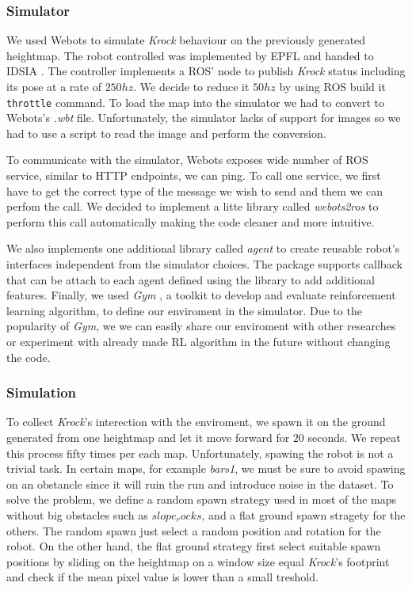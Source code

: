 \documentclass[../document.tex]{subfiles}
\begin{document}
\subsubsection{Simulator}
We used Webots to simulate \emph{Krock} behaviour on the previously generated heightmap. The robot controlled was implemented by EPFL  and handed to IDSIA . The controller implements a ROS' node to publish \emph{Krock} status including its pose at a rate of $250hz$. We decide to reduce it $50hz$ by using ROS build it \texttt{throttle} command. 
To load the map into the simulator we had to convert to Webots's \emph{.wbt} file. Unfortunately, the simulator lacks of support for images so we had to use a script to read the image and perform the conversion.

To communicate with the simulator, Webots exposes wide number of ROS service, similar to HTTP endpoints, we can ping. To call one service, we first have to get the correct type of the message we wish to send and them we can perfom the call. We decided to implement a litte library called \emph{webots2ros}  to perform this call automatically making the code cleaner and more intuitive. 

We also implements one additional library called \emph{agent}  to create reusable robot's interfaces independent from the simulator choices. The package supports callback that can be attach to each agent defined using the library to add additional features. Finally, we used \emph{Gym} \cite{gym}, a toolkit to develop and evaluate reinforcement learning algorithm, to define our enviroment in the simulator. Due to the popularity of \emph{Gym}, we  we can easily share our enviroment with other researches or experiment with already made RL algorithm in the future without changing the code.

\subsubsection{Simulation}
To collect \emph{Krock}'s interection with the enviroment, we spawn it on the ground generated from one heightmap and let it move forward for $20$ seconds. We repeat this process fifty times per each map.
    Unfortunately, spawing the robot is not a trivial task. In certain maps, for example \emph{bars1}, we must be sure to avoid spawing on an obstancle since it will ruin the run and introduce noise in the dataset. To solve the problem, we define a random spawn strategy used in most of the maps without big obstacles such as $slope_rocks$, and a flat ground spawn stragety for the others. The random spawn just select a random position and rotation for the robot. On the other hand, the flat ground strategy first select suitable spawn positions by sliding on the heightmap on a window size equal \emph{Krock}'s footprint and check if the mean pixel value is lower than a small treshold. 
    
\end{document}
